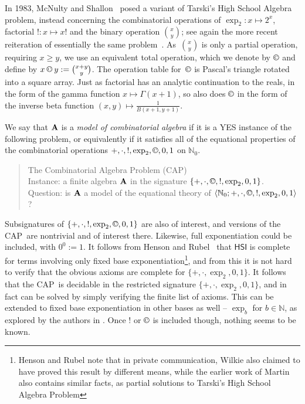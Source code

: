 \documentclass[eqnor,reqno]{amsart}
\theoremstyle{plain}
\theoremstyle{definition}
\newcommand{\cc}{\mathbin{\textup{\copyright}}}
\newcommand{\CAP}{\textsf{CAP}}
\begin{document}
In 1983, McNulty and Shallon~\cite{mcnsha} posed a variant of Tarski's High School Algebra problem, instead concerning the combinatorial operations of $\exp_2:x\mapsto 2^x$, factorial $!:x\mapsto x!$ and the binary operation $\binom{x}{y}$; see again the more recent reiteration of essentially the same problem~\cite{mcn}.  
As~$\binom{x}{y}$ is only a partial operation, requiring $x\geq y$, we use an equivalent total operation, which we denote by $\cc$ and define by $x\cc y:=\binom{x+y}{y}$.  The operation table for~$\cc$ is Pascal's triangle rotated into a square array.  Just as factorial has an analytic continuation to the reals, in the form of the gamma function $x\mapsto \Gamma(x+1)$, so also does $\cc$ in the form of the inverse beta function $(x,y)\mapsto \frac{1}{B(x+1,y+1)}$.

We say that ${\bf A}$ is a \emph{model of combinatorial algebra} if it is a YES instance of the following problem, or equivalently if it satisfies all of the equational properties of the combinatorial operations $+,\cdot,!,\exp_2,\cc,0,1$ on $\mathbb{N}_0$.
\begin{quotation}
\noindent\textsf{The Combinatorial Algebra Problem (CAP)}\\
\textsf{Instance}: a finite algebra ${\bf A}$ in the signature $\{+,\cdot,\cc,!,\exp_2,0,1\}$.\\
\textsf{Question}:  is ${\bf A}$ a model of the equational theory of $\langle \mathbb{N}_0;+,\cdot,\cc,!,\exp_2,0,1\rangle$?
\end{quotation}
Subsignatures of $\{+,\cdot,!,\exp_2,\cc,0,1\}$ are also of interest, and versions of the \CAP\  are nontrivial and of interest there.  Likewise, full exponentiation could be included, with $0^0:=1$.  
It follows from Henson and Rubel~\cite{henrub} that  $\mathsf{HSI}$ is complete for terms involving only fixed base exponentiation\footnote{Henson and Rubel note that in private communication, Wilkie also claimed to have proved this result by different means, while the earlier work of Martin~\cite{mar} also contains similar facts, as partial solutions to Tarski's High School Algebra Problem}, and from this it is not hard to verify that the obvious axioms are complete for $\{+,\cdot,\exp_2,0,1\}$.  
It follows that the \CAP\ is decidable in the restricted signature $\{+,\cdot,\exp_2,0,1\}$, and in fact can be solved by simply verifying the finite list of axioms.  
This can be extended to fixed base exponentiation in other bases as well -- $\exp_b$ for $b\in \mathbb{N}$, as explored by the authors in \cite{alsjac}.  Once $!$ or $\cc$ is included though, nothing seems to be known.
\end{document}

